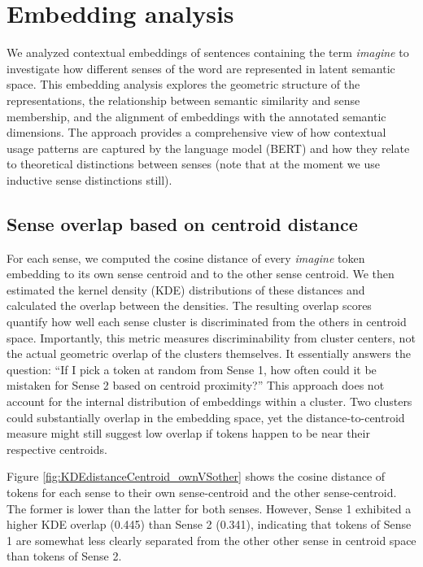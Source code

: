 \documentclass[
]{article}
\begin{document}
\section{Embedding analysis}\label{embedding-analysis}

We analyzed contextual embeddings of sentences containing the term
\textit{imagine} to investigate how different senses of the word are
represented in latent semantic space. This embedding analysis explores
the geometric structure of the representations, the relationship between
semantic similarity and sense membership, and the alignment of
embeddings with the annotated semantic dimensions. The approach provides
a comprehensive view of how contextual usage patterns are captured by
the language model (BERT) and how they relate to theoretical
distinctions between senses (note that at the moment we use inductive
sense distinctions still).

\subsection{Sense overlap based on centroid
distance}\label{sense-overlap-based-on-centroid-distance}

For each sense, we computed the cosine distance of every
\textit{imagine} token embedding to its own sense centroid and to the
other sense centroid. We then estimated the kernel density (KDE)
distributions of these distances and calculated the overlap between the
densities. The resulting overlap scores quantify how well each sense
cluster is discriminated from the others in centroid space. Importantly,
this metric measures discriminability from cluster centers, not the
actual geometric overlap of the clusters themselves. It essentially
answers the question: ``If I pick a token at random from Sense 1, how
often could it be mistaken for Sense 2 based on centroid proximity?''
This approach does not account for the internal distribution of
embeddings within a cluster. Two clusters could substantially overlap in
the embedding space, yet the distance-to-centroid measure might still
suggest low overlap if tokens happen to be near their respective
centroids.

Figure \ref{fig:KDEdistanceCentroid_ownVSother} shows the cosine
distance of tokens for each sense to their own sense-centroid and the
other sense-centroid. The former is lower than the latter for both
senses. However, Sense 1 exhibited a higher KDE overlap (0.445) than
Sense 2 (0.341), indicating that tokens of Sense 1 are somewhat less
clearly separated from the other other sense in centroid space than
tokens of Sense 2.
\end{document}
